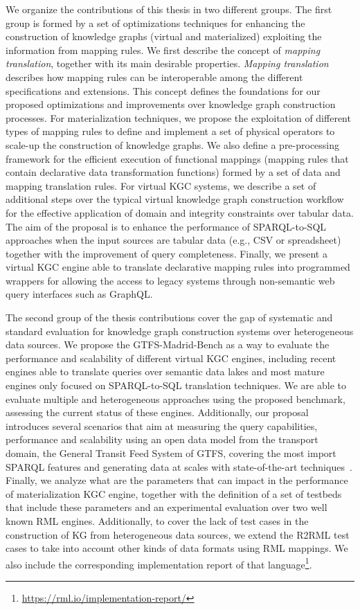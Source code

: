 We organize the contributions of this thesis in two different groups. The first group is formed by a set of optimizations techniques for enhancing the construction of knowledge graphs (virtual and materialized) exploiting the information from mapping rules. We first describe the concept of \textit{mapping translation}, together with its main desirable properties. \textit{Mapping translation} describes how mapping rules can be interoperable among the different specifications and extensions. This concept defines the foundations for our proposed optimizations and improvements over knowledge graph construction processes. For materialization techniques, we propose the exploitation of different types of mapping rules to define and implement a set of physical operators to scale-up the construction of knowledge graphs. We also define a pre-processing framework for the efficient execution of functional mappings (mapping rules that contain declarative data transformation functions) formed by a set of data and mapping translation rules. For virtual KGC systems, we describe a set of additional steps over the typical virtual knowledge graph construction workflow for the effective application of domain and integrity constraints over tabular data. The aim of the proposal is to enhance the performance of SPARQL-to-SQL approaches when the input sources are tabular data (e.g., CSV or spreadsheet) together with the improvement of query completeness. Finally, we present a virtual KGC engine able to translate declarative mapping rules into programmed wrappers for allowing the access to legacy systems through non-semantic web query interfaces such as GraphQL.

The second group of the thesis contributions cover the gap of systematic and standard evaluation for knowledge graph construction systems over heterogeneous data sources. We propose the GTFS-Madrid-Bench as a way to evaluate the performance and scalability of different virtual KGC engines, including recent engines able to translate queries over semantic data lakes and most mature engines only focused on SPARQL-to-SQL translation techniques. We are able to evaluate multiple and heterogeneous approaches using the proposed benchmark, assessing the current status of these engines. Additionally, our proposal introduces several scenarios that aim at measuring the query capabilities, performance and scalability using an open data model from the transport domain, the General Transit Feed System of GTFS, covering the most import SPARQL features and generating data at scales with state-of-the-art techniques~\citep{lantivig}. Finally, we analyze what are the parameters that can impact in the performance of materialization KGC engine, together with the definition of a set of testbeds that include these parameters and an experimental evaluation over two well known RML engines. Additionally, to cover the lack of test cases in the construction of KG from heterogeneous data sources, we extend the R2RML test cases to take into account other kinds of data formats using RML mappings. We also include the corresponding implementation report of that language\footnote{\url{https://rml.io/implementation-report/}}.




